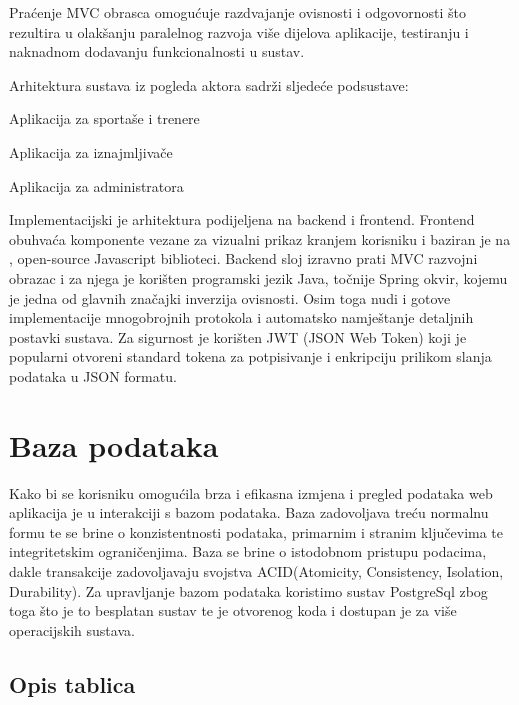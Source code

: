 		Praćenje MVC obrasca omogućuje razdvajanje ovisnosti i odgovornosti što rezultira u olakšanju paralelnog razvoja više dijelova aplikacije, testiranju i naknadnom dodavanju funkcionalnosti u sustav.
		
		Arhitektura sustava iz pogleda aktora sadrži sljedeće podsustave:
		
		\begin{packed_item}
			\item Aplikacija za sportaše i trenere
			\item Aplikacija za iznajmljivače
			\item Aplikacija za administratora
		\end{packed_item}
		
		Implementacijski je arhitektura podijeljena na backend i frontend.
		Frontend obuhvaća komponente vezane za vizualni prikaz kranjem korisniku i baziran je na , open-source Javascript biblioteci. Backend sloj izravno prati MVC razvojni obrazac i za njega je korišten programski jezik Java, točnije Spring okvir, kojemu je jedna od glavnih značajki inverzija ovisnosti. Osim toga nudi i gotove implementacije mnogobrojnih protokola i automatsko namještanje detaljnih postavki sustava. Za sigurnost je korišten JWT (JSON Web Token) koji je popularni otvoreni standard tokena za potpisivanje i enkripciju prilikom slanja podataka u JSON formatu.

				
		\section{Baza podataka}
			
		Kako bi se korisniku omogućila brza i efikasna izmjena i pregled podataka web aplikacija je u interakciji s bazom podataka. Baza zadovoljava treću normalnu formu te se brine o konzistentnosti podataka, primarnim i stranim ključevima te integritetskim ograničenjima. Baza se brine o istodobnom pristupu podacima, dakle transakcije zadovoljavaju svojstva ACID(Atomicity, Consistency, Isolation, Durability). Za upravljanje bazom podataka koristimo sustav PostgreSql zbog toga što je to besplatan sustav te je otvorenog koda i dostupan je za više operacijskih sustava.
		
			\subsection{Opis tablica}
			
